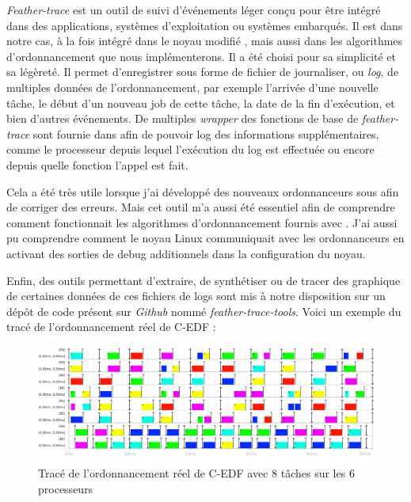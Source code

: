 \textit{Feather-trace} \cite{brandenburg2007feather} est un outil de suivi d'événements léger conçu pour être intégré dans des applications, systèmes d'exploitation ou systèmes embarqués. Il est dans notre cas, à la fois intégré dans le noyau modifié \litmus, mais aussi dans les algorithmes d'ordonnancement que nous implémenterons. Il a été choisi pour sa simplicité et sa légèreté. Il permet d'enregistrer sous forme de fichier de journaliser, ou \textit{log}, de multiples données de l'ordonnancement, par exemple l'arrivée d'une nouvelle tâche, le début d'un nouveau job de cette tâche, la date de la fin d'exécution, et bien d'autres événements. De multiples \textit{wrapper} des fonctions de base de \textit{feather-trace} sont fournie dans \litmus afin de pouvoir log des informations supplémentaires, comme le processeur depuis lequel l'exécution du log est effectuée ou encore depuis quelle fonction l'appel est fait.

Cela a été très utile lorsque j'ai développé des nouveaux ordonnanceurs sous \litmus afin de corriger des erreurs. Mais cet outil m'a aussi été essentiel afin de comprendre comment fonctionnait les algorithmes d'ordonnancement fournis avec \litmus. J'ai aussi pu comprendre comment le noyau Linux communiquait avec les ordonnanceurs en activant des sorties de debug additionnels dans la configuration du noyau.

Enfin, des outils permettant d'extraire, de synthétiser ou de tracer des graphique de certaines données de ces fichiers de logs sont mis à notre disposition sur un dépôt de code présent sur \textit{Github} nommé \textit{feather-trace-tools}. Voici un exemple du tracé de l'ordonnancement réel de C-EDF :

\begin{figure}[H]
     \centering
     \includegraphics[width=\textwidth]{Images/schedule_host=rock960_scheduler=C-EDF_trace=C-EDF-OFFSET.png}
     \caption{Tracé de l'ordonnancement réel de C-EDF avec 8 tâches sur les 6 processeurs}
     \label{fig:trace-cedf}
\end{figure}



